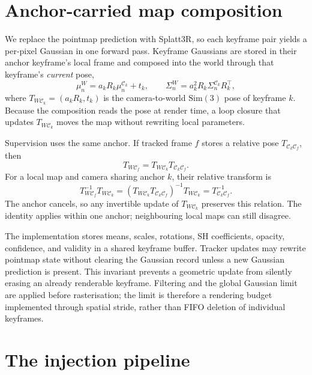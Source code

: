 \section{Anchor-carried map composition}
\label{sec:system:anchor}
We replace the pointmap prediction with Splatt3R, so each keyframe pair yields
a per-pixel Gaussian in one forward pass. Keyframe Gaussians are stored in
their anchor keyframe's local frame and composed into the world through that
keyframe's \emph{current} pose,
\begin{equation}
\mu_n^{W}=a_kR_k\mu_n^{\mathcal C_k}+t_k,\qquad
\Sigma_n^{W}=a_k^2R_k\Sigma_n^{\mathcal C_k}R_k^\top,
\label{eq:anchor}
\end{equation}
where $T_{W\mathcal C_k}=(a_kR_k,t_k)$ is the camera-to-world
$\mathrm{Sim}(3)$ pose of keyframe $k$. Because the composition reads the
pose at render time, a loop closure that updates $T_{W\mathcal C_k}$ moves
the map without rewriting local parameters.

Supervision uses the same anchor. If tracked frame $f$ stores a relative pose
$T_{\mathcal C_k\mathcal C_f}$, then
\begin{equation}
T_{W\mathcal C_f}
=T_{W\mathcal C_k}T_{\mathcal C_k\mathcal C_f}.
\label{eq:supervisionpose}
\end{equation}
For a local map and camera sharing anchor $k$, their relative transform is
\begin{equation}
T_{W\mathcal C_f}^{-1}T_{W\mathcal C_k}
=(T_{W\mathcal C_k}T_{\mathcal C_k\mathcal C_f})^{-1}
 T_{W\mathcal C_k}
=T_{\mathcal C_k\mathcal C_f}^{-1}.
\label{eq:anchorconsistency}
\end{equation}
The anchor cancels, so any invertible update of $T_{W\mathcal C_k}$ preserves
this relation. The identity applies within one anchor; neighbouring local maps
can still disagree.

The implementation stores means, scales, rotations, SH coefficients, opacity,
confidence, and validity in a shared keyframe buffer. Tracker updates may
rewrite pointmap state without clearing the Gaussian record unless a new
Gaussian prediction is present. This invariant prevents a geometric update
from silently erasing an already renderable keyframe. Filtering and the
global Gaussian limit are applied before rasterisation; the limit is therefore
a rendering budget implemented through spatial stride, rather than FIFO
deletion of individual keyframes.

\section{The injection pipeline}
\label{sec:system:injection}

